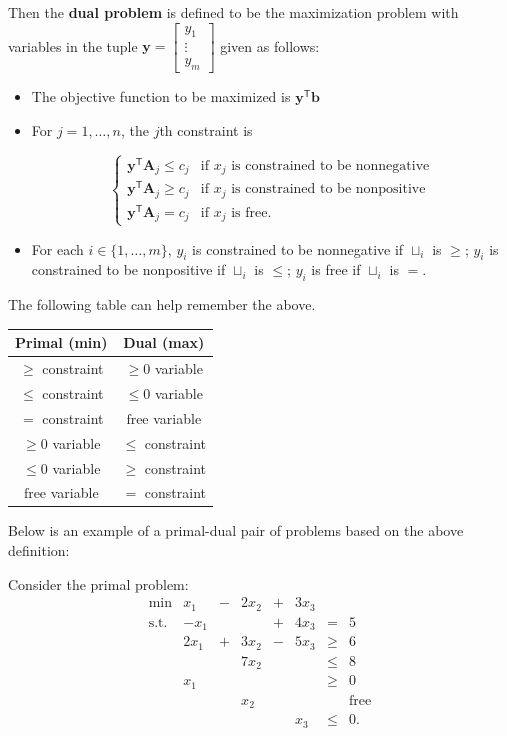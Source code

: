 \documentclass[]{book}
\newcommand{\T}{\mathsf{T}}
\newcommand{\mm}[1]{\mathbf{#1}}
\renewcommand{\vec}[1]{\mathbf{#1}}
\theoremstyle{definition}
\theoremstyle{definition}
\theoremstyle{remark}
\begin{document}
Then the \textbf{dual problem} is defined to be the maximization problem
with variables in the tuple
\(\vec{y} = \begin{bmatrix} y_1\\ \vdots\\ y_m\end{bmatrix}\) given as
follows:

\begin{itemize}
\item
  The objective function to be maximized is \(\vec{y}^\T \vec{b}\)
\item
  For \(j = 1,\ldots, n\), the \(j\)th constraint is

  \begin{equation*}
  \left \{\begin{array}{ll}
  \vec{y}^\T\mm{A}_j \leq c_j & \text{if } x_j \text{ is constrained to 
  be nonnegative} \\
  \vec{y}^\T\mm{A}_j \geq c_j & \text{if } x_j \text{ is constrained to 
  be nonpositive} \\
  \vec{y}^\T\mm{A}_j = c_j & \text{if } x_j \text{ is free}.
  \end{array}\right.
  \end{equation*}
\item
  For each \(i \in \{1,\ldots,m\}\), \(y_i\) is constrained to be
  nonnegative if \(\sqcup_i\) is \(\geq\); \(y_i\) is constrained to be
  nonpositive if \(\sqcup_i\) is \(\leq\); \(y_i\) is free if
  \(\sqcup_i\) is \(=\).
\end{itemize}

The following table can help remember the above.

\begin{longtable}[]{@{}cc@{}}
\toprule
Primal (min) & Dual (max)\tabularnewline
\midrule
\endhead
\(\geq\) constraint & \(\geq 0\) variable\tabularnewline
\(\leq\) constraint & \(\leq 0\) variable\tabularnewline
\(=\) constraint & \(\text{free}\) variable\tabularnewline
\(\geq 0\) variable & \(\leq\) constraint\tabularnewline
\(\leq 0\) variable & \(\geq\) constraint\tabularnewline
\(\text{free}\) variable & \(=\) constraint\tabularnewline
\bottomrule
\end{longtable}

Below is an example of a primal-dual pair of problems based on the above
definition:

Consider the primal problem: \[\begin{array}{rrcrcrcl}
\mbox{min} &  x_1 & - & 2x_2 & + & 3x_3 & \\
\mbox{s.t.} & -x_1 &   &      & + & 4x_3 &  =   &5 \\
            & 2x_1 & + & 3x_2 & - & 5x_3 & \geq &  6 \\
            &      &   & 7x_2 &   &      & \leq &  8 \\
            &  x_1 &   &      &   &      & \geq &  0 \\
            &     &    & x_2  &   &      & &      \mbox{free} \\
            &     &    &      &   & x_3  & \leq & 0.\\
\end{array}\]
\end{document}
